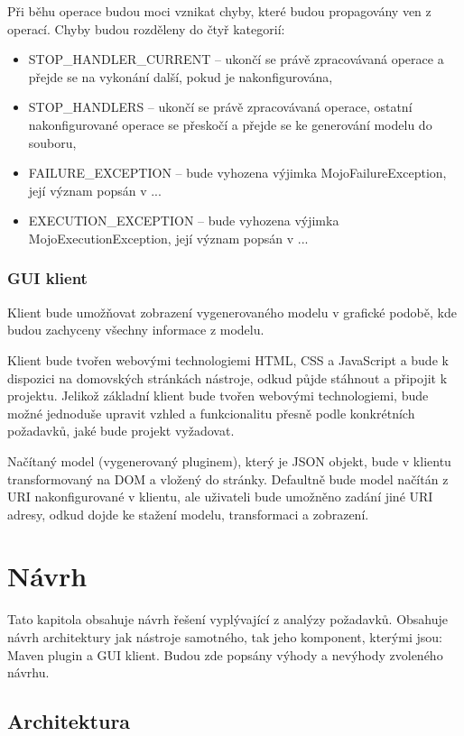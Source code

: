 \documentclass[11pt,twoside,a4paper]{book}
\begin{document}
\begin{itemize}
Při běhu operace budou moci vznikat chyby, které budou propagovány ven z operací. Chyby
budou rozděleny do čtyř kategorií:

\begin{itemize}
  \item STOP\_HANDLER\_CURRENT – ukončí se právě zpracovávaná operace a přejde
  se na vykonání další, pokud je nakonfigurována,
  \item STOP\_HANDLERS – ukončí se právě zpracovávaná operace, ostatní 
  nakonfigurované operace se přeskočí a přejde se ke generování modelu do souboru,
  \item FAILURE\_EXCEPTION – bude vyhozena výjimka MojoFailureException, její
význam popsán v ...
  \item EXECUTION\_EXCEPTION – bude vyhozena výjimka MojoExecutionException,
  její význam popsán v ...
\end{itemize}

\subsection{GUI klient}

Klient bude umožňovat zobrazení vygenerovaného modelu v grafické podobě, kde budou
zachyceny všechny informace z modelu.

Klient bude tvořen webovými technologiemi HTML, CSS a JavaScript a bude k dispozici na
domovských stránkách nástroje, odkud půjde stáhnout a připojit k projektu. Jelikož základní
klient bude tvořen webovými technologiemi, bude možné jednoduše upravit vzhled a
funkcionalitu přesně podle konkrétních požadavků, jaké bude projekt vyžadovat.

Načítaný model (vygenerovaný pluginem), který je JSON objekt, bude v klientu
transformovaný na DOM a vložený do stránky. Defaultně bude model načítán z URI
nakonfigurované v klientu, ale uživateli bude umožněno zadání jiné URI adresy, odkud dojde
ke stažení modelu, transformaci a zobrazení.

\chapter{Návrh}

Tato kapitola obsahuje návrh řešení vyplývající z analýzy požadavků. Obsahuje návrh
architektury jak nástroje samotného, tak jeho komponent, kterými jsou: Maven plugin a GUI
klient. Budou zde popsány výhody a nevýhody zvoleného návrhu.

\section{Architektura}


\end{itemize}
\end{document}
